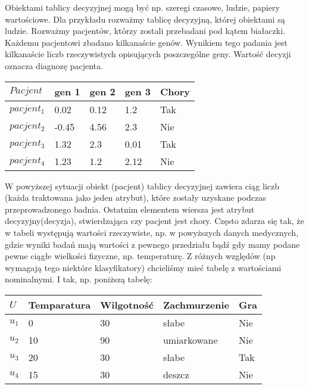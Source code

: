 \documentclass[magisterska]{pracamgr}
\theoremstyle{plain}
\theoremstyle{definition}
\theoremstyle{remark}
\begin{document}
Obiektami tablicy decyzyjnej mogą być np. szeregi czasowe, ludzie,
papiery wartościowe. \newline Dla przykładu rozważmy tablicę decyzyjną,
której obiektami są ludzie. Rozważmy pacjentów, którzy zostali przebadani pod kątem białaczki.
Każdemu pacjentowi zbadano kilkanaście genów. Wynikiem tego padania jest kilkanaście 
liczb rzeczywistych opisujących poszczególne geny. Wartość decyzji oznacza diagnozę pacjenta.
\newline
\begin{center}
 \begin{tabular}{l || P{2.5cm} P{2.5cm} P{2.5cm} | P{1.5cm}}
  $Pacjent$     & gen 1 & gen 2 & gen 3 & Chory \\ 
  \hline
  $pacjent_{1}$ & 0.02       & 0.12       & 1.2    & Tak \\
  $pacjent_{2}$ & -0.45      & 4.56       & 2.3    & Nie \\
  $pacjent_{3}$ & 1.32       & 2.3        & 0.01   & Tak \\
  $pacjent_{4}$ & 1.23       & 1.2        & 2.12   & Nie \\
 \end{tabular}
\end{center}
W powyższej sytuacji obiekt (pacjent) tablicy decyzyjnej zawiera ciąg liczb (każda traktowana jako
jeden atrybut), które zostały uzyskane podczas przeprowadzonego badnia. Ostatnim elementem wiersza
jest atrybut decyzyjny(decyzja), stwierdzająca czy pacjent jest chory.
\newline
Często zdarza się tak, że w tabeli występują wartości rzeczywiste, np. w powyższych danych medycznych, gdzie 
wyniki badań mają wartości z pewnego przedziału bądź gdy mamy podane pewne ciągłe wielkości fizyczne, np.
temperaturę. Z różnych względów (np wymagają tego niektóre klasyfikatory) chcieliśmy mieć tabelę z wartościami
nominalnymi. I tak, np. poniższą tabelę:

\begin{center}
 \begin{tabular}{l || P{2.5cm} P{2.5cm} P{2.5cm} | P{1.5cm}}
  $U$     & Temparatura & Wilgotność & Zachmurzenie & Gra \\ 
  \hline
  $u_{1}$ & 0      & 30      & słabe          & Nie \\
  $u_{2}$ & 10     & 90      & umiarkowane    & Nie \\
  $u_{3}$ & 20     & 30      & słabe   	      & Tak \\
  $u_{4}$ & 15     & 30      & deszcz         & Nie \\
 \end{tabular}
\end{center}
\end{document}
